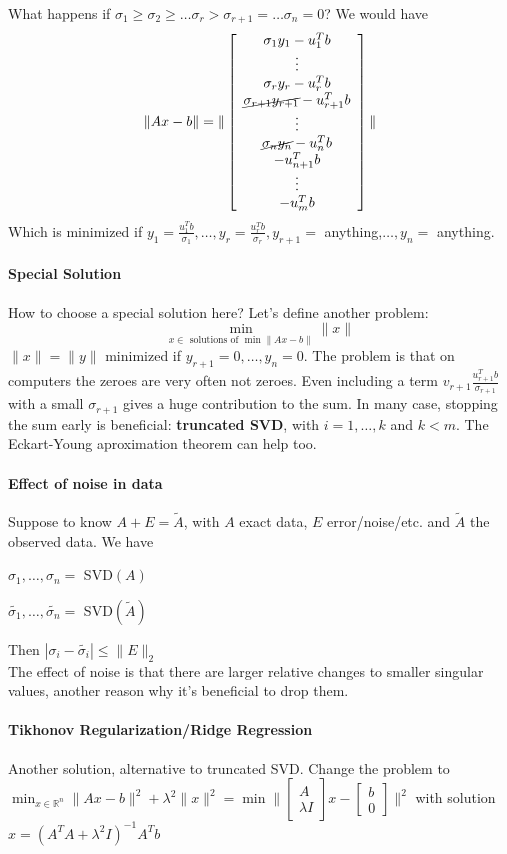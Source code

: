 \documentclass[10pt]{report}
\begin{document}
What happens if $\sigma_1\geq \sigma_2 \geq \ldots \sigma_r > \sigma_{r+1} = \ldots \sigma_n = 0$? We would have $$\|Ax-b\|=\|\left[\begin{array}{c}
\sigma_1y_1-u_1^Tb\\\vdots\\\sigma_ry_r-u_r^Tb\\\cancel{\sigma_{r+1}y_{r+1}}-u_{r+1}^Tb\\\vdots\\\cancel{\sigma_ny_n}-u_n^Tb\\-u_{n+1}^Tb\\\vdots\\-u_m^Tb
\end{array}\right]\|$$
Which is minimized if $y_1=\frac{u_1^Tb}{\sigma_1},\ldots,y_r=\frac{u_r^Tb}{\sigma_r},y_{r+1}=$ anything,$\ldots,y_n =$ anything.
\paragraph{Special Solution} How to choose a special solution here? Let's define another problem: $$\min_{x\in\text{ solutions of }\min\|Ax-b\|} \|x\|$$
$\|x\|=\|y\|$ minimized if $y_{r+1} = 0,\ldots,y_n = 0$. The problem is that on computers the zeroes are very often not zeroes. Even including a term $v_{r+1}\frac{u_{r+1}^Tb}{\sigma_{r+1}}$ with a small $\sigma_{r+1}$ gives a huge contribution to the sum. In many case, stopping the sum early is beneficial: \textbf{truncated SVD}, with $i=1,\ldots,k$ and $k<m$. The Eckart-Young aproximation theorem can help too.
\paragraph{Effect of noise in data} Suppose to know $A+E = \tilde{A}$, with $A$ exact data, $E$ error/noise/etc. and $\tilde{A}$ the observed data. We have
\begin{list}{}{}
	\item $\sigma_1,\ldots,\sigma_n =$ SVD$(A)$
	\item $\tilde{\sigma_1},\ldots,\tilde{\sigma_n} =$ SVD$(\tilde{A})$
\end{list}
Then $|\sigma_i - \tilde{\sigma_i}| \leq \|E\|_2$\\
The effect of noise is that there are larger relative changes to smaller singular values, another reason why it's beneficial to drop them.
\paragraph{Tikhonov Regularization/Ridge Regression} Another solution, alternative to truncated SVD. Change the problem to $\min_{x\in \mathbb{R}^n} \|Ax-b\|^2 + \lambda^2\|x\|^2 = \min\|\left[\begin{array}{c}
A\\\lambda I
\end{array}\right]x - \left[\begin{array}{c}
b\\0
\end{array}\right]\|^2$ with solution $x = (A^TA+\lambda^2 I)^{-1}A^Tb$
\end{document}
